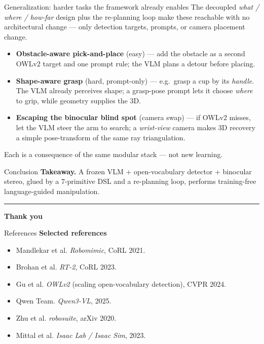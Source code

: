 \documentclass[aspectratio=169,10pt]{beamer}
\begin{document}
\begin{frame}{Generalization: harder tasks the framework already enables}
The decoupled \emph{what / where / how-far} design plus the re-planning loop make these reachable with \alert{no architectural change} --- only detection targets, prompts, or camera placement change.
\vspace{4pt}
\begin{itemize}
    \item \textbf{Obstacle-aware pick-and-place} \textcolor{accent3}{(easy)} --- add the obstacle as a second OWLv2 target and one prompt rule; the VLM plans a detour before placing.
    \item \textbf{Shape-aware grasp} \textcolor{accent2}{(hard, prompt-only)} --- e.g.\ grasp a cup by its \emph{handle}. The VLM already perceives shape; a grasp-pose prompt lets it choose \emph{where} to grip, while geometry supplies the 3D.
    \item \textbf{Escaping the binocular blind spot} \textcolor{accent}{(camera swap)} --- if OWLv2 misses, let the VLM steer the arm to search; a \emph{wrist-view} camera makes 3D recovery a simple pose-transform of the same ray triangulation.
\end{itemize}
\vspace{4pt}
\footnotesize\textcolor{muted}{Each is a consequence of the same modular stack --- not new learning.}
\end{frame}

\begin{frame}{Conclusion}
\textbf{Takeaway.} A frozen VLM + open-vocabulary detector + binocular stereo, glued by a 7-primitive DSL and a re-planning loop, performs \alert{training-free} language-guided manipulation.
\vspace{20pt}
\hrule
\vspace{6pt}
\centering\large\textbf{Thank you}
\end{frame}

\begin{frame}{References}
\textbf{Selected references}
\begin{itemize}
    \item Mandlekar et al. \emph{Robomimic}, CoRL 2021.
    \item Brohan et al. \emph{RT-2}, CoRL 2023.
    \item Gu et al. \emph{OWLv2} (scaling open-vocabulary detection), CVPR 2024.
    \item Qwen Team. \emph{Qwen3-VL}, 2025.
    \item Zhu et al. \emph{robosuite}, arXiv 2020.
    \item Mittal et al. \emph{Isaac Lab / Isaac Sim}, 2023.
\end{itemize}
\end{frame}
\end{document}
